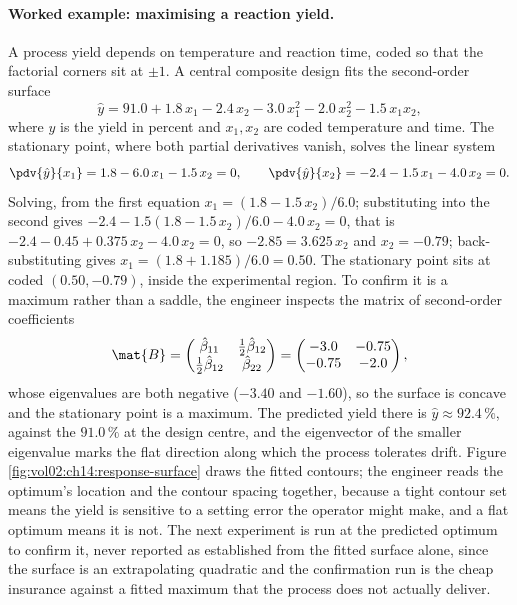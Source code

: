 \paragraph{Worked example: maximising a reaction yield.} A process
yield depends on temperature and reaction time, coded so that the
factorial corners sit at $\pm 1$. A central composite design fits the
second-order surface
\[
\hat{y} = 91.0 + 1.8\,x_{1} - 2.4\,x_{2} - 3.0\,x_{1}^{2}
- 2.0\,x_{2}^{2} - 1.5\,x_{1}x_{2},
\]
where $y$ is the yield in percent and $x_{1}, x_{2}$ are coded
temperature and time. The stationary point, where both partial
derivatives vanish, solves the linear system
\[
\pdv{\hat{y}}{x_{1}} = 1.8 - 6.0\,x_{1} - 1.5\,x_{2} = 0,
\qquad
\pdv{\hat{y}}{x_{2}} = -2.4 - 1.5\,x_{1} - 4.0\,x_{2} = 0.
\]
Solving, from the first equation $x_{1} = (1.8 - 1.5\,x_{2})/6.0$;
substituting into the second gives $-2.4 - 1.5(1.8 - 1.5\,x_{2})/6.0
- 4.0\,x_{2} = 0$, that is $-2.4 - 0.45 + 0.375\,x_{2} - 4.0\,x_{2}
= 0$, so $-2.85 = 3.625\,x_{2}$ and $x_{2} = -0.79$; back-substituting
gives $x_{1} = (1.8 + 1.185)/6.0 = 0.50$. The stationary point sits at
coded $(0.50, -0.79)$, inside the experimental region. To confirm it is
a maximum rather than a saddle, the engineer inspects the matrix of
second-order coefficients
\[
\mat{B} = \begin{pmatrix} \hat{\beta}_{11} & \tfrac{1}{2}\hat{\beta}_{12}
\\ \tfrac{1}{2}\hat{\beta}_{12} & \hat{\beta}_{22} \end{pmatrix}
= \begin{pmatrix} -3.0 & -0.75 \\ -0.75 & -2.0 \end{pmatrix},
\]
whose eigenvalues are both negative ($-3.40$ and $-1.60$), so the
surface is concave and the stationary point is a maximum. The
predicted yield there is $\hat{y} \approx 92.4\,\%$, against the
$91.0\,\%$ at the design centre, and the eigenvector of the smaller
eigenvalue marks the flat direction along which the process tolerates
drift. Figure \ref{fig:vol02:ch14:response-surface} draws the fitted
contours; the engineer reads the optimum's location and the contour
spacing together, because a tight contour set means the yield is
sensitive to a setting error the operator might make, and a flat
optimum means it is not. The next experiment is run at the predicted
optimum to confirm it, never reported as established from the fitted
surface alone, since the surface is an extrapolating quadratic and the
confirmation run is the cheap insurance against a fitted maximum that
the process does not actually deliver.

